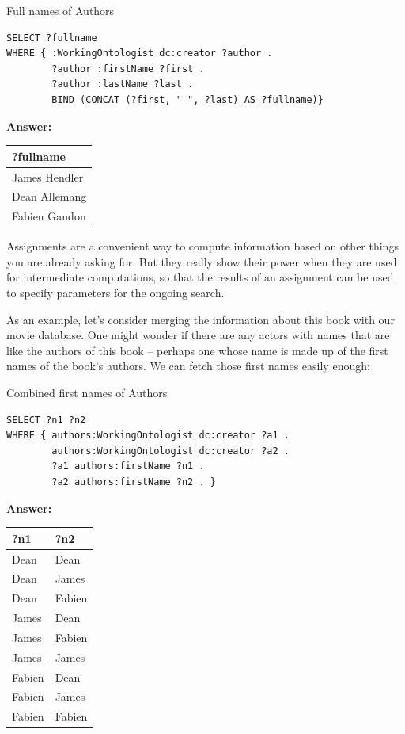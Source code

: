 \begin{query}Full names of Authors\end{query}

\begin{lstlisting}
SELECT ?fullname
WHERE { :WorkingOntologist dc:creator ?author .
        ?author :firstName ?first .
        ?author :lastName ?last . 
        BIND (CONCAT (?first, " ", ?last) AS ?fullname)}
\end{lstlisting}


\textbf{\textbf{Answer:}}

\begin{tabular}{|l|}
\hline
?fullname\\
\hline
James Hendler\\
Dean Allemang\\
Fabien Gandon\\
\hline
\end{tabular}

Assignments are a convenient way to compute information based on other
things you are already asking for. But they really show their power when
they are used for intermediate computations, so that the results of an
assignment can be used to specify parameters for the ongoing search.

As an example, let's consider merging the information about this book
with our movie database. One might wonder if there are any actors with
names that are like the authors of this book -- perhaps one whose name
is made up of the first names of the book's authors. We can fetch those
first names easily enough:

\begin{query}Combined first names of Authors\end{query}

\begin{lstlisting}
SELECT ?n1 ?n2
WHERE { authors:WorkingOntologist dc:creator ?a1 .
        authors:WorkingOntologist dc:creator ?a2 .
        ?a1 authors:firstName ?n1 .
        ?a2 authors:firstName ?n2 . }
\end{lstlisting}

\textbf{\textbf{Answer:}}

\begin{tabular} {|ll|}
\hline
?n1&?n2\\
\hline
Dean&Dean\\
Dean&James\\
Dean&Fabien\\
James&Dean\\
James&Fabien\\
James&James\\
Fabien&Dean\\
Fabien&James\\
Fabien&Fabien\\
\hline
\end{tabular}

